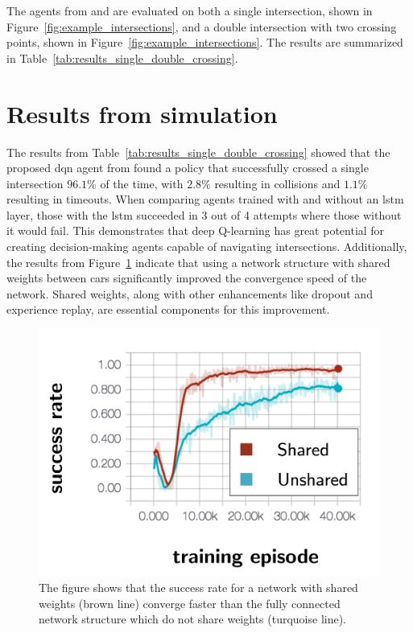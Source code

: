 The agents from \paperLSTM and \paperMPC are evaluated on both a single intersection, shown in Figure~\ref{fig:example_intersections}, and a double intersection with two crossing points, shown in Figure~\ref{fig:example_intersections}. The results are summarized in Table~\ref{tab:results_single_double_crossing}.

\section{Results from simulation}
The results from Table~\ref{tab:results_single_double_crossing} showed that the proposed \gls{dqn} agent from \paperLSTM found a policy that successfully crossed a single intersection $96.1\%$ of the time, with $2.8\%$ resulting in collisions and $1.1\%$ resulting in timeouts. 
When comparing agents trained with and without an \gls{lstm} layer, those with the \gls{lstm} succeeded in 3 out of 4 attempts where those without it would fail.
This demonstrates that deep Q-learning has great potential for creating decision-making agents capable of navigating intersections. Additionally, the results from Figure~\ref{fig:results_shared} indicate that using a network structure with shared weights between cars significantly improved the convergence speed of the network. Shared weights, along with other enhancements like dropout and experience replay, are essential components for this improvement.

\begin{figure}[!ht]
	\centering
	\includegraphics[width=0.7\columnwidth]{YourThesis/papers/lstm/figures/results_shared.png}
	\caption{The figure shows that the success rate for a network with shared weights (brown line) converge faster than the fully connected network structure which do not share weights (turquoise line).}
	\label{fig:results_shared}
\end{figure}


